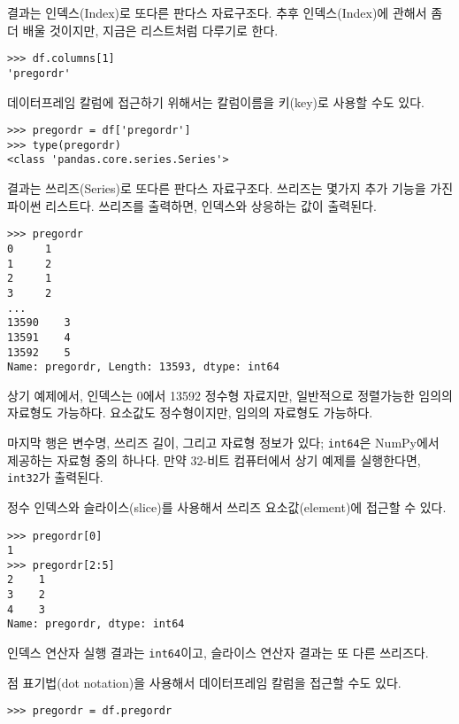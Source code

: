 결과는 인덱스(Index)로 또다른 판다스 자료구조다. 추후 인덱스(Index)에 관해서 좀더 배울 것이지만, 지금은 리스트처럼 다루기로 한다.


\begin{verbatim}
>>> df.columns[1]
'pregordr'
\end{verbatim}

데이터프레임 칼럼에 접근하기 위해서는 칼럼이름을 키(key)로 사용할 수도 있다.


\begin{verbatim}
>>> pregordr = df['pregordr']
>>> type(pregordr)
<class 'pandas.core.series.Series'>
\end{verbatim}

결과는 쓰리즈(Series)로 또다른 판다스 자료구조다. 쓰리즈는 몇가지 추가 기능을 가진 파이썬 리스트다. 쓰리즈를 출력하면, 인덱스와 상응하는 값이 출력된다. 


\begin{verbatim}
>>> pregordr
0     1
1     2
2     1
3     2
...
13590    3
13591    4
13592    5
Name: pregordr, Length: 13593, dtype: int64
\end{verbatim}

상기 예제에서, 인덱스는 0에서 13592 정수형 자료지만, 일반적으로 정렬가능한 임의의 자료형도 가능하다. 요소값도 정수형이지만, 임의의 자료형도 가능하다.

마지막 행은 변수명, 쓰리즈 길이, 그리고 자료형 정보가 있다; {\tt int64}은 NumPy에서 제공하는 자료형 중의 하나다. 만약 32-비트 컴퓨터에서 상기 예제를 실행한다면, {\tt int32}가 출력된다.

정수 인덱스와 슬라이스(slice)를 사용해서 쓰리즈 요소값(element)에 접근할 수 있다.

\begin{verbatim}
>>> pregordr[0]
1
>>> pregordr[2:5]
2    1
3    2
4    3
Name: pregordr, dtype: int64
\end{verbatim}

인덱스 연산자 실행 결과는 {\tt int64}이고, 슬라이스 연산자 결과는 또 다른 쓰리즈다. 

점 표기법(dot notation)을 사용해서 데이터프레임 칼럼을 접근할 수도 있다.


\begin{verbatim}
>>> pregordr = df.pregordr
\end{verbatim}

